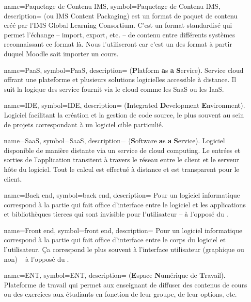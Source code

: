   {
	name=Paquetage de Contenu IMS,
	symbol=Paquetage de Contenu IMS,
	description=
	{
	  (ou IMS Content Packaging) est un format de paquet de contenu créé par
	  l'IMS Global Learning Consortium. C'est un format standardisé qui permet
	  l'échange -- import, export, etc. -- de contenu entre différents systèmes
	  reconnaissant ce format là. Nous l'utiliseront car c'est un des format à
	  partir duquel Moodle sait importer un cours.
	}
}

  {
	name=PaaS,
	symbol=PaaS,
	description=
	{
	  ({\bf P}latform {\bf a}s {\bf a} {\bf S}ervice). Service cloud offrant une
	  plateforme et plusieurs solutions logicielles accessible à distance. Il
	  suit la logique des service fournit via le cloud comme les SaaS ou les
	  IaaS.
    }
}

  {
	name=IDE,
	symbol=IDE,
	description=
	{
	  ({\bf I}ntegrated {\bf D}evelopment {\bf E}nvironment). Logiciel facilitant
	  la création et la gestion de code source, le plus souvent au sein de
	  projets correspondant à un logiciel cible particulié.
	}
  }

  {
	name=SaaS,
	symbol=SaaS,
	description={
	  ({\bf S}oftware {\bf a}s {\bf a} {\bf S}ervice). Logiciel disponible de
	  manière distante via un service de cloud computing. Le entrées et sorties
	  de l'application transitent à travers le réseau entre le client et le
	  serveur hôte du logiciel. Tout le calcul est effectué à distance et est
	  transparent pour le client.
	}
  }

  {
	name=Back end,
	symbol=back end,
	description={
	  Pour un logiciel informatique correspond à la partie qui fait office
	  d'interface entre le logiciel et les applications et bibliothèques tierces
	  qui sont invisible pour l'utilisateur -- à l'opposé du .
	}
  }

  {
	name=Front end,
	symbol=front end,
	description={
	  Pour un logiciel informatique correspond à la partie qui fait office
	  d'interface entre le corps du logiciel et l'utilisateur. Ça correspond le
	  plus souvent à l'interface utilisateur (graphique ou non) -- à l'opposé du
	  .
	}
  }

  {
	name=ENT,
	symbol=ENT,
	description={
	  ({\bf E}space {\bf N}umérique de {\bf T}ravail). 
	  Plateforme de travail qui permet aux enseignant de diffuser des contenus
	  de cours ou des exercices aux étudiants en fonction de leur groupe, de
	  leur options, etc.
	}
  }

